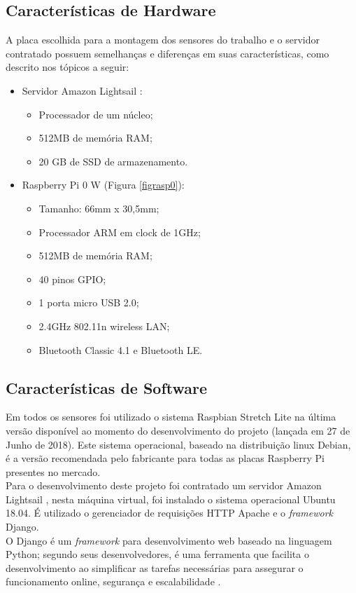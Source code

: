 \subsection{Características de Hardware}
\quad A placa escolhida para a montagem dos sensores do trabalho e o servidor contratado possuem semelhanças e diferenças em suas características, como descrito nos tópicos a seguir:
\begin{itemize}
  \item Servidor Amazon Lightsail \cite{lightsail}:
  \begin{itemize}
    \item Processador de um núcleo;
    \item 512MB de memória RAM;
    \item 20 GB de SSD de armazenamento.
  \end{itemize}
  \item Raspberry Pi 0 W (Figura \ref{figrasp0}):
  \begin{itemize}
    \item Tamanho: 66mm x 30,5mm;
    \item Processador ARM em clock de 1GHz;
    \item 512MB de memória RAM;
    \item 40 pinos GPIO;
    \item 1 porta micro USB 2.0;
    \item 2.4GHz 802.11n wireless LAN;
    \item Bluetooth Classic 4.1 e Bluetooth LE.
  \end{itemize}
\end{itemize}
\subsection{Características de Software}
\quad Em todos os sensores foi utilizado o sistema Raspbian Stretch Lite na última versão disponível ao momento do desenvolvimento do projeto (lançada em 27 de Junho de 2018).
Este sistema operacional, baseado na distribuição linux Debian, é a versão recomendada pelo fabricante para todas as placas Raspberry Pi presentes no mercado.
\\\null\quad Para o desenvolvimento deste projeto foi contratado um servidor Amazon Lightsail \cite{lightsail}, nesta máquina virtual, foi instalado o sistema operacional Ubuntu 18.04. É utilizado o gerenciador de requisições HTTP Apache e o \textit{framework} Django.
\\\null\quad O Django é um \textit{framework} para desenvolvimento web baseado na linguagem Python; segundo seus desenvolvedores, é uma ferramenta que facilita o desenvolvimento ao simplificar as tarefas necessárias para assegurar o funcionamento online, segurança e escalabilidade \cite{django}.

